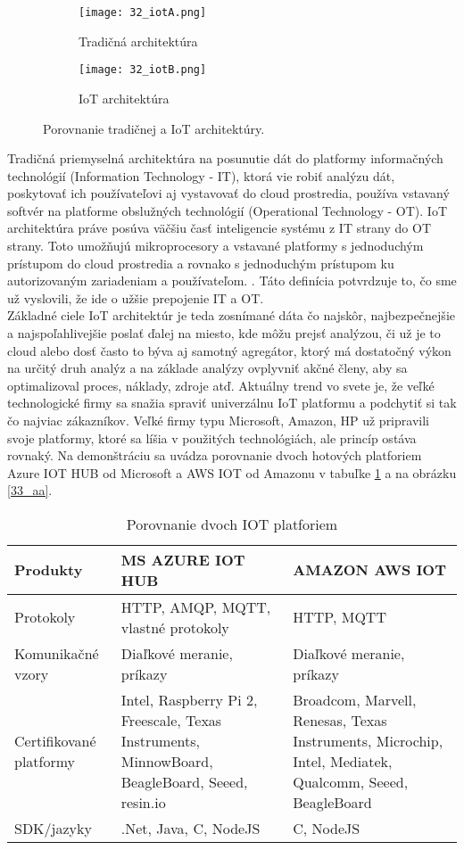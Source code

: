\begin{figure}[!htbp]
\centering
\begin{subfigure}{0.5\linewidth}
\texttt{[image: 32\_iotA.png]}
\caption{Tradičná architektúra \cite{IOT21}}
\label{32_iotA}
\end{subfigure}%
\begin{subfigure}{0.5\linewidth}
\texttt{[image: 32\_iotB.png]}
\caption{IoT architektúra \cite{IOT21}}
\label{32_iotB}
\end{subfigure}
\caption{Porovnanie tradičnej a IoT architektúry.}
\end{figure}
Tradičná priemyselná architektúra na posunutie dát do platformy informačných technológií (Information Technology - IT), ktorá vie robiť analýzu dát, poskytovať ich používateľovi aj vystavovať do cloud prostredia, používa vstavaný softvér na platforme obslužných technológií (Operational Technology - OT). IoT architektúra práve posúva väčšiu časť inteligencie systému z IT strany do OT strany. Toto umožňujú mikroprocesory a vstavané platformy s jednoduchým prístupom do cloud prostredia a rovnako s jednoduchým prístupom ku autorizovaným zariadeniam a používateľom. \cite{IOT21}. Táto definícia potvrdzuje to, čo sme už vyslovili, že ide o užšie prepojenie IT a OT. \\
\indent Základné ciele IoT architektúr je teda zosnímané dáta čo najskôr, najbezpečnejšie a najspoľahlivejšie poslať ďalej na miesto, kde môžu prejsť analýzou, či už je to cloud alebo dosť často to býva aj samotný agregátor, ktorý má dostatočný výkon na určitý druh analýz a na základe analýzy ovplyvniť akčné členy, aby sa optimalizoval proces, náklady, zdroje atď. Aktuálny trend vo svete je, že  veľké technologické firmy sa snažia spraviť univerzálnu IoT platformu a podchytiť si tak čo najviac zákazníkov. Veľké firmy typu Microsoft, Amazon, HP už pripravili svoje platformy, ktoré sa líšia v použitých technológiách, ale princíp ostáva rovnaký. Na demonštráciu sa uvádza porovnanie dvoch hotových platforiem Azure IOT HUB od Microsoft a AWS IOT od Amazonu v tabuľke \ref{table:1} a na obrázku \ref{33_aa}.
\begin{table}[h!]
\centering
 \caption{Porovnanie dvoch IOT platforiem \cite{IOT22} }
 \begin{tabular}{ |p{4cm}|p{5.5cm}p{5.5cm}| } 
 \hline
 Produkty & MS AZURE IOT HUB & AMAZON AWS IOT \\ 
 \hline\hline
 Protokoly & HTTP, AMQP, MQTT, vlastné protokoly & HTTP, MQTT  \\ 
 \hline
 Komunikačné vzory & Diaľkové meranie, príkazy & Diaľkové meranie, príkazy \\
 \hline
 Certifikované platformy &  Intel, Raspberry Pi 2, Freescale, Texas Instruments, MinnowBoard, BeagleBoard, Seeed, resin.io & 
Broadcom, Marvell, Renesas, Texas Instruments, Microchip, Intel, Mediatek, Qualcomm, Seeed, BeagleBoard \\
 \hline
 SDK/jazyky & 	.Net, Java, C, NodeJS & C, NodeJS \\
 \hline
\end{tabular}
\label{table:1}
\end{table}

